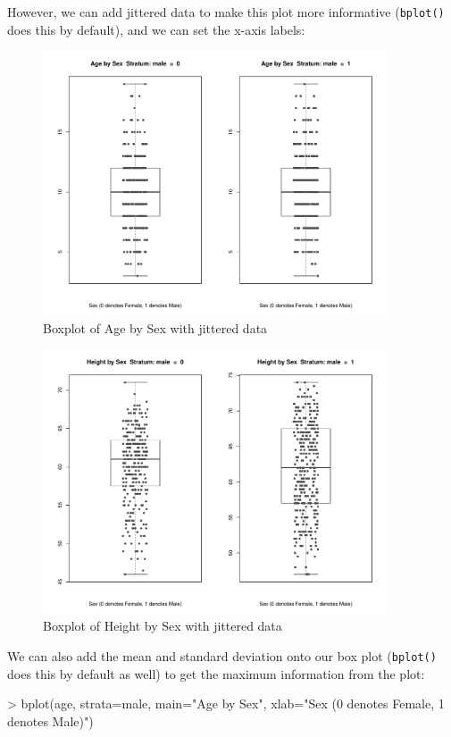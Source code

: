 \documentclass[landscape]{article}
\renewenvironment{Schunk}{\vspace{\topsep}}{\vspace{\topsep}}
\begin{document}
\clearpage
However, we can add jittered data to make this plot more informative (\texttt{bplot()} does this by default), and we can set the x-axis labels:\\
\begin{figure}[h]
\centering
\includegraphics[width=4in, height=3.08in]{fevdoc-agebplot2}
\caption{Boxplot of Age by Sex with jittered data}
\label{agebplot2}
\end{figure}
\clearpage
\begin{figure}[h]
\centering
\includegraphics[width=4in, height=3.08in]{fevdoc-heightbplot2}
\caption{Boxplot of Height by Sex with jittered data}
\label{heightbplot2}
\end{figure}
\clearpage
We can also add the mean and standard deviation onto our box plot (\texttt{bplot()} does this by default as well) to get the maximum information from the plot:\\
\begin{Schunk}
\begin{Sinput}
> bplot(age, strata=male, main="Age by Sex", xlab="Sex (0 denotes Female, 1 denotes Male)")
\end{Sinput}
\end{Schunk}
\end{document}
